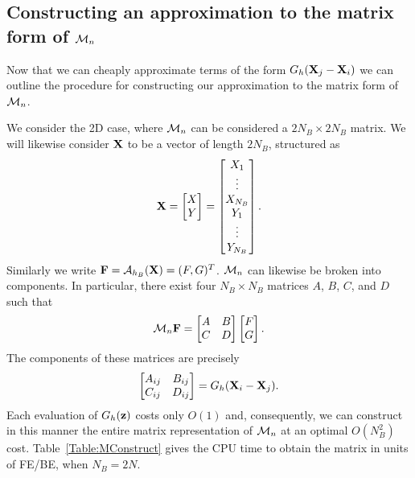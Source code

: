 \subsection{Constructing an approximation to the matrix form of $\mathcal{M}_n$}
Now that we can cheaply approximate terms of the form $G_h(\mathbf{X}_j - \mathbf{X}_i)$ we can outline the procedure for constructing our approximation to the matrix form of $\mathcal{M}_n$.

We consider the 2D case, where $\mathcal{M}_n$ can be considered a $2N_B \times 2N_B$ matrix. We will likewise consider $\mathbf{X}$ to be a vector of length $2N_B$, structured as
\begin{equation}
\mathbf{X}=\begin{bmatrix} X \\ Y \end{bmatrix} =
 \begin{bmatrix} X_1 \\ \vdots \\ X_{N_B} \\Y_1 \\ \vdots \\Y_{N_B}
\end{bmatrix}.
\end{equation}
Similarly we write  $\mathbf{F}=\mathcal{A}_{h_B}(\mathbf{X})=(F,G)^T$. $\mathcal{M}_n$ can likewise be broken into components. In particular, there exist four $N_B\times N_B$ matrices $A$, $B$, $C$, and $D$ such that
\begin{equation}
\mathcal{M}_n\mathbf{F} =
\begin{bmatrix}
A & B \\
C & D \end{bmatrix}
\begin{bmatrix}
F  \\
G \end{bmatrix} . \label{meq:ABCD}
\end{equation}
The components of these matrices are precisely
\begin{equation}
\begin{bmatrix}
A_{ij} & B_{ij} \\
C_{ij} & D_{ij} \end{bmatrix}
= G_h(\mathbf{X}_i - \mathbf{X}_j).
\end{equation}
Each evaluation of $G_h(\mathbf{z})$  costs only $O(1)$  and, consequently, we can construct in 
this manner  the entire matrix representation of $\mathcal{M}_n$ at an optimal $O(N_B^2)$ cost.
Table~\ref{Table:MConstruct} gives the CPU time to obtain the matrix in units of FE/BE, when $N_B=2N$. 




